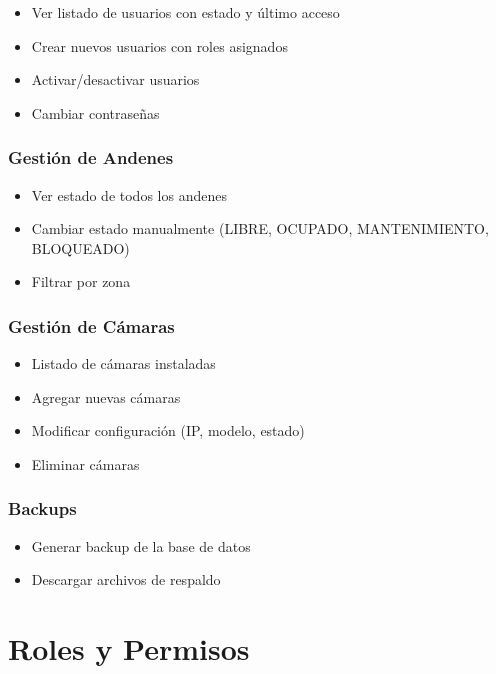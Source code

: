 \documentclass[12pt,a4paper]{article}
\begin{document}
\begin{itemize}
    \item Ver listado de usuarios con estado y último acceso
    \item Crear nuevos usuarios con roles asignados
    \item Activar/desactivar usuarios
    \item Cambiar contraseñas
\end{itemize}

\subsubsection{Gestión de Andenes}

\begin{itemize}
    \item Ver estado de todos los andenes
    \item Cambiar estado manualmente (LIBRE, OCUPADO, MANTENIMIENTO, BLOQUEADO)
    \item Filtrar por zona
\end{itemize}

\subsubsection{Gestión de Cámaras}

\begin{itemize}
    \item Listado de cámaras instaladas
    \item Agregar nuevas cámaras
    \item Modificar configuración (IP, modelo, estado)
    \item Eliminar cámaras
\end{itemize}

\subsubsection{Backups}

\begin{itemize}
    \item Generar backup de la base de datos
    \item Descargar archivos de respaldo
\end{itemize}

\section{Roles y Permisos}
\end{document}
